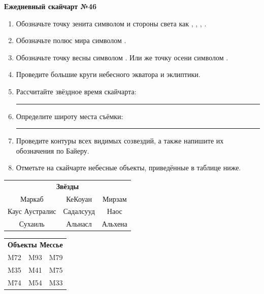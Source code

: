 \documentclass{./SAS-class-skygen}
\begin{document}
    
    
    
	\begin{center}
		\large\textbf{Ежедневный скайчарт №46}
	\end{center}

	\begin{enumerate}
		\item Обозначьте точку зенита символом  и стороны света как , , , .
		\item Обозначьте полюс мира символом .
		\item Обозначьте точку весны символом \Aries. Или же точку осени символом \Libra.
		\item Проведите большие круги небесного экватора и эклиптики.
		\item Рассчитайте звёздное время скайчарта: \rule{2cm}{0.4pt}
		\item Определите широту места съёмки: \rule{2cm}{0.4pt}
		\item Проведите контуры всех видимых созвездий, а также напишите их обозначения по Байеру.
		\item Отметьте на скайчарте небесные объекты, приведённые в таблице ниже.
	\end{enumerate}
	
    \vspace{0.5cm}

    \begin{table}[h!]
    \centering
    \begin{tabular}{ccc}
    \multicolumn{3}{c}{\textbf{Звёзды}} \\ Маркаб & КеКоуан & Мирзам \\
Каус Аустралис & Садалсууд & Наос \\
Сухаиль & Альнасл & Альхена \\

\end{tabular}
    \hfill
    \begin{tabular}{ccc}
    \multicolumn{3}{c}{\textbf{Объекты Мессье}} \\ M72 & M93 & M79 \\
M35 & M41 & M75 \\
M74 & M54 & M33 \\

\end{tabular}
    \end{table}
	
\end{document}
